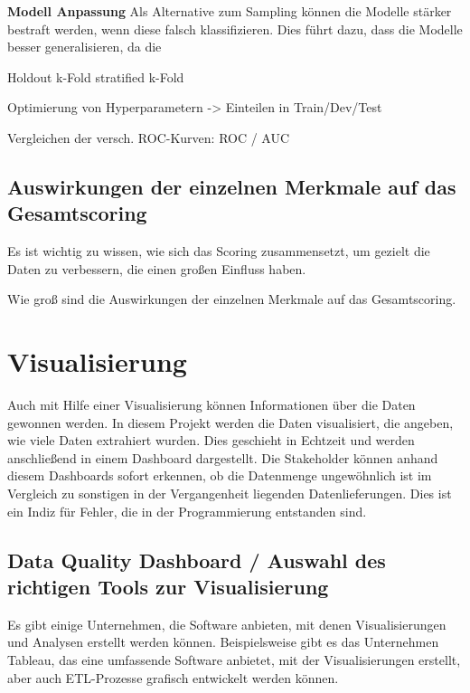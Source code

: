 \textbf{Modell Anpassung}
Als Alternative zum Sampling können die Modelle stärker bestraft werden, wenn diese falsch klassifizieren. 
Dies führt dazu, dass die Modelle besser generalisieren, da die 


Holdout
k-Fold
stratified k-Fold

Optimierung von Hyperparametern 
-> Einteilen in Train/Dev/Test

Vergleichen der versch. ROC-Kurven:
ROC / AUC


\subsection{Auswirkungen der einzelnen Merkmale auf das Gesamtscoring}
Es ist wichtig zu wissen, wie sich das Scoring zusammensetzt, um gezielt die Daten zu verbessern, die einen großen Einfluss haben. 

Wie groß sind die Auswirkungen der einzelnen Merkmale auf das Gesamtscoring. 

\section{Visualisierung}
Auch mit Hilfe einer Visualisierung können Informationen über die Daten gewonnen werden.
In diesem Projekt werden die Daten visualisiert, die angeben, wie viele Daten extrahiert wurden.
Dies geschieht in Echtzeit und werden anschließend in einem Dashboard dargestellt.
Die Stakeholder können anhand diesem Dashboards sofort erkennen, ob die Datenmenge ungewöhnlich ist im Vergleich zu sonstigen in der Vergangenheit liegenden Datenlieferungen.
Dies ist ein Indiz für Fehler, die in der Programmierung entstanden sind.


\subsection{Data Quality Dashboard / Auswahl des richtigen Tools zur Visualisierung}


Es gibt einige Unternehmen, die Software anbieten, mit denen Visualisierungen und Analysen erstellt werden können. 
Beispielsweise gibt es das Unternehmen Tableau, das eine umfassende Software anbietet, mit der Visualisierungen erstellt, aber auch ETL-Prozesse grafisch entwickelt werden können.  
\cite{https://www.tableau.com/de-de/why-tableau/what-is-tableau}

